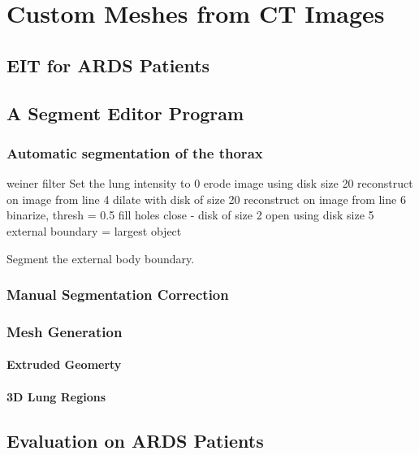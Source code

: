\chapter{Custom Meshes from CT Images}

\section{EIT for ARDS Patients}

\section{A Segment Editor Program}

\subsection{Automatic segmentation of the thorax}
\begin{algorithm}[H]
	\SetAlgoLined
		weiner filter\;
		Set the lung intensity to 0\;
		erode image using disk size 20\;
		reconstruct on image from line 4\;
		dilate with disk of size 20\;
		reconstruct on image from line 6\;
		binarize, thresh = 0.5\;
		fill holes\;
		close - disk of size 2\;
		open using disk size 5\;
		external boundary = largest object\;
	\caption{Segment the external body boundary.}
\end{algorithm}

\subsection{Manual Segmentation Correction}

\subsection{Mesh Generation}
\subsubsection{Extruded Geomerty}
\subsubsection{3D Lung Regions}


\section{Evaluation on ARDS Patients}

